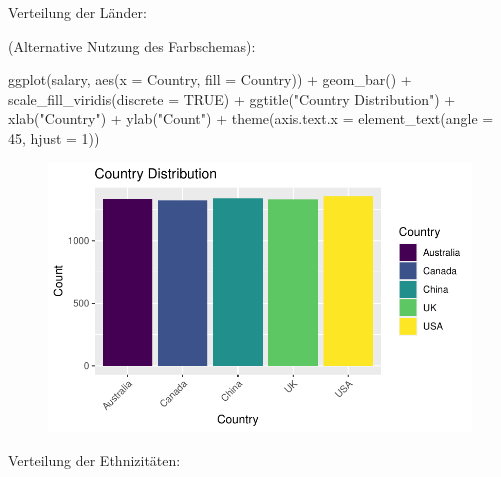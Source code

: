 \documentclass[
  letterpaper,
  DIV=11,
  numbers=noendperiod]{scrartcl}
\newenvironment{Shaded}{\begin{snugshade}}{\end{snugshade}}
\newcommand{\AttributeTok}[1]{\textcolor[rgb]{0.40,0.45,0.13}{#1}}
\newcommand{\ConstantTok}[1]{\textcolor[rgb]{0.56,0.35,0.01}{#1}}
\newcommand{\DecValTok}[1]{\textcolor[rgb]{0.68,0.00,0.00}{#1}}
\newcommand{\FunctionTok}[1]{\textcolor[rgb]{0.28,0.35,0.67}{#1}}
\newcommand{\NormalTok}[1]{\textcolor[rgb]{0.00,0.23,0.31}{#1}}
\newcommand{\SpecialCharTok}[1]{\textcolor[rgb]{0.37,0.37,0.37}{#1}}
\newcommand{\StringTok}[1]{\textcolor[rgb]{0.13,0.47,0.30}{#1}}
\begin{document}
Verteilung der Länder:

(Alternative Nutzung des Farbschemas):

\begin{Shaded}
\begin{Highlighting}[]
\FunctionTok{ggplot}\NormalTok{(salary, }\FunctionTok{aes}\NormalTok{(}\AttributeTok{x =}\NormalTok{ Country, }\AttributeTok{fill =}\NormalTok{ Country)) }\SpecialCharTok{+}
  \FunctionTok{geom\_bar}\NormalTok{() }\SpecialCharTok{+}
  \FunctionTok{scale\_fill\_viridis}\NormalTok{(}\AttributeTok{discrete =} \ConstantTok{TRUE}\NormalTok{) }\SpecialCharTok{+}
  \FunctionTok{ggtitle}\NormalTok{(}\StringTok{"Country Distribution"}\NormalTok{) }\SpecialCharTok{+}
  \FunctionTok{xlab}\NormalTok{(}\StringTok{"Country"}\NormalTok{) }\SpecialCharTok{+}
  \FunctionTok{ylab}\NormalTok{(}\StringTok{"Count"}\NormalTok{) }\SpecialCharTok{+}
  \FunctionTok{theme}\NormalTok{(}\AttributeTok{axis.text.x =} \FunctionTok{element\_text}\NormalTok{(}\AttributeTok{angle =} \DecValTok{45}\NormalTok{, }\AttributeTok{hjust =} \DecValTok{1}\NormalTok{))}
\end{Highlighting}
\end{Shaded}

\begin{figure}[H]

{\centering \includegraphics{main_doc_files/figure-pdf/unnamed-chunk-12-1.pdf}

}

\end{figure}

Verteilung der Ethnizitäten:
\end{document}
